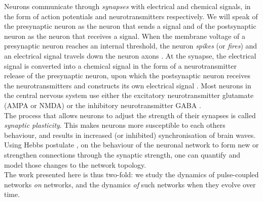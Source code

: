 Neurons communicate through \textsl{synapses} with electrical and chemical signals, in the form of action potentials and neurotransmitters respectively. We will speak of the presynaptic neuron as the neuron that sends a signal and of the postsynaptic neuron as the neuron that receives a signal. When the membrane voltage of a presynaptic neuron reaches an internal threshold, the neuron \textsl{spikes} (or \textsl{fires}) and an electrical signal travels down the neuron axons \cite{IntroductionModelingDynamics}. At the synapse, the electrical signal is converted into a chemical signal in the form of a neurotransmitter release of the presynaptic neuron, upon which the postsynaptic neuron receives the neurotransmitters and constructs its own electrical signal \cite{ActionPotentialsAndSynapses}. Most neurons in the central nervous system use either the excitatory neurotransmitter glutamate (AMPA or NMDA) or the inhibitory neurotransmitter GABA \cite{MathFoundationNeuroscience, Zhang2012}. \\


The process that allows neurons to adjust the strength of their synapses is called \textsl{synaptic plasticity}. This makes neurons more susceptible to each others behaviour, and results in increased (or inhibited) synchronisation of brain waves. Using Hebbs postulate \cite{Hebb1949}, on the behaviour of the neuronal network to form new or strengthen connections through the synaptic strength, one can quantify and model those changes to the network topology. \\

The work presented here is thus two-fold:  we study the dynamics of pulse-coupled networks \textsl{on} networks, and the dynamics \textsl{of} such networks when they evolve over time. 